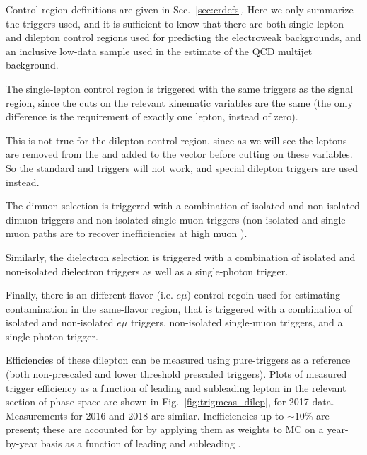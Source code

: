Control region definitions are given in Sec.~\ref{sec:crdefs}. Here we only summarize the triggers used,
and it is sufficient to know that there are both single-lepton and dilepton control regions used for
predicting the electroweak backgrounds, and an inclusive low-\Ht data sample used in the estimate
of the QCD multijet background.

The single-lepton control region is triggered with the same triggers as the signal region, since
the cuts on the relevant kinematic variables are the same (the only difference is the requirement of
exactly one lepton, instead of zero).

This is not true for the dilepton control region, since as we will see the leptons are removed from
the \Ht and added to the \vMet vector before cutting on these variables. So the standard \Ht and
\ptmiss triggers will not work, and special dilepton triggers are used instead.

The dimuon selection is triggered with a combination of isolated and non-isolated
dimuon triggers and non-isolated single-muon triggers (non-isolated and single-muon
paths are to recover inefficiencies at high muon \pt).

Similarly, the dielectron selection is triggered with a combination of isolated and non-isolated
dielectron triggers as well as a single-photon trigger.

Finally, there is an different-flavor (i.e. $e\mu$) control regoin used for estimating \ttbar contamination
in the same-flavor region, that is triggered with a combination of isolated and non-isolated
$e\mu$ triggers, non-isolated single-muon triggers, and a single-photon trigger.

Efficiencies of these dilepton can be measured using pure-\Ht triggers as a reference (both non-prescaled
and lower threshold prescaled triggers).
Plots of measured trigger efficiency as a function of leading and subleading lepton \pt in the relevant
section of phase space are shown in Fig.~\ref{fig:trigmeas_dilep}, for 2017 data. Measurements for 2016 
and 2018 are similar. Inefficiencies up to $\sim10$\% are present; these are accounted for by
applying them as weights to MC on a year-by-year basis as a function of leading and subleading \pt.

